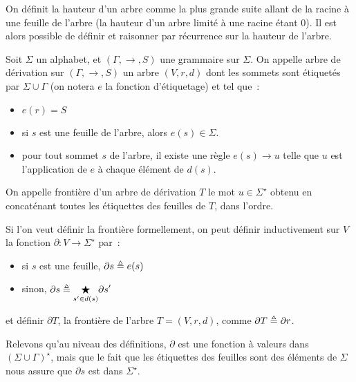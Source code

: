 On définit la hauteur d'un arbre comme la plus grande suite allant de la racine
à une feuille de l'arbre (la hauteur d'un arbre limité à une racine étant $0$).
Il est alors possible de définir et raisonner par récurrence sur la hauteur de
l'arbre.

\begin{definition}
  Soit $\Sigma$ un alphabet, et $(\Gamma,\to,S)$ une grammaire sur $\Sigma$.
  On appelle arbre de dérivation sur $(\Gamma,\to,S)$ un arbre $(V,r,d)$ dont
  les sommets sont étiquetés par $\Sigma\cup\Gamma$ (on notera $e$ la fonction
  d'étiquetage) et tel que~:
  \begin{itemize}
  \item $e(r) = S$
  \item si $s$ est une feuille de l'arbre, alors $e(s) \in \Sigma$.
  \item pour tout sommet $s$ de l'arbre, il existe une règle $e(s) \to u$ telle
    que $u$ est l'application de $e$ à chaque élément de $d(s)$.
  \end{itemize}

  On appelle frontière d'un arbre de dérivation $T$ le mot
  $u \in \Sigma^\star$ obtenu en concaténant toutes les étiquettes
  des feuilles de $T$, dans l'ordre.
\end{definition}

\begin{remark}
  Si l'on veut définir la frontière formellement, on peut définir inductivement
  sur $V$ la fonction $\partial : V \to \Sigma^\star$ par~:
  \begin{itemize}
  \item si $s$ est une feuille, $\partial s \triangleq e(s)$
  \item sinon,
    $\displaystyle\partial s \triangleq \underset{{s' \in d(s)}}{\bigstar}
    \partial s'$
  \end{itemize}
  et définir $\partial T$, la frontière de l'arbre $T = (V,r,d)$, comme
  $\partial T \triangleq \partial r$.

  Relevons qu'au niveau des définitions, $\partial$ est une fonction à valeurs
  dans $(\Sigma\cup\Gamma)^\star$, mais que le fait que les étiquettes des
  feuilles sont des éléments de $\Sigma$ nous assure que $\partial s$ est
  dans $\Sigma^\star$.
\end{remark}

